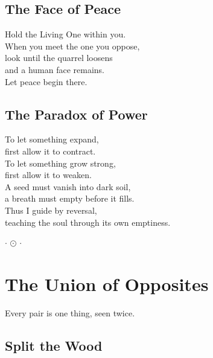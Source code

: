 \documentclass[10pt, openright]{book}
\newcommand{\sectionbreak}{\filbreak}
\newcommand{\sayingsource}[1]{\par\nopagebreak\vspace{0.3\baselineskip}{\raggedleft\footnotesize\itshape #1\par}}
\newcommand{\ornament}{
    \vspace{1.5cm}
    \begin{center}
        \large \(\cdot\) \(\odot\) \(\cdot\)
    \end{center}
    \vspace{1.5cm}
}
\begin{document}
\sayingsource{Tao Te Ching 8, 34 · Odes of Solomon 6}

\sectionbreak

\section{The Face of Peace}\label{the-face-of-peace}

Hold the Living One within you.\\
When you meet the one you oppose,\\
look until the quarrel loosens\\
and a human face remains.\\
Let peace begin there.

\sayingsource{Tao Te Ching 35 · John 14:27}

\sectionbreak

\section{The Paradox of Power}\label{the-paradox-of-power}

To let something expand,\\
first allow it to contract.\\
To let something grow strong,\\
first allow it to weaken.\\
A seed must vanish into dark soil,\\
a breath must empty before it fills.\\
Thus I guide by reversal,\\
teaching the soul through its own emptiness.

\sayingsource{Tao Te Ching 36 · John 12:24}

\ornament

\chapter{The Union of Opposites}\label{the-union-of-opposites}

\begin{center}
Every pair is one thing, seen twice.
\end{center}

\sectionbreak

\section{Split the Wood}\label{split-the-wood}
\end{document}
